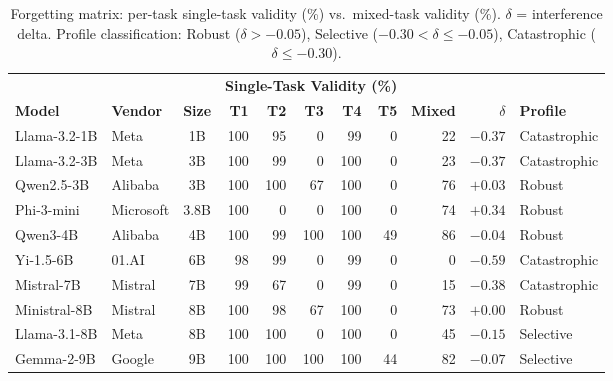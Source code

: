 \documentclass[11pt]{article}
\begin{document}
\begin{table}[t]
\centering
\caption{Forgetting matrix: per-task single-task validity (\%) vs.\ mixed-task validity (\%). $\delta$ = interference delta.  Profile classification: \textcolor{robust}{Robust} ($\delta > -0.05$), \textcolor{selective}{Selective} ($-0.30 < \delta \leq -0.05$), \textcolor{catastrophic}{Catastrophic} ($\delta \leq -0.30$).}
\label{tab:forgetting}
\small
\begin{adjustbox}{max width=\textwidth}
\begin{tabular}{llc rrrrr rr l}
\toprule
& & & \multicolumn{5}{c}{\textbf{Single-Task Validity (\%)}} & & & \\
\cmidrule(lr){4-8}
\textbf{Model} & \textbf{Vendor} & \textbf{Size} & \textbf{T1} & \textbf{T2} & \textbf{T3} & \textbf{T4} & \textbf{T5} & \textbf{Mixed} & $\delta$ & \textbf{Profile} \\
\midrule
Llama-3.2-1B    & Meta      & 1B   & 100 & 95 & 0  & 99 & 0  & 22 & $-0.37$ & \textcolor{catastrophic}{Catastrophic} \\
Llama-3.2-3B    & Meta      & 3B   & 100 & 99 & 0  & 100 & 0  & 23 & $-0.37$ & \textcolor{catastrophic}{Catastrophic} \\
Qwen2.5-3B      & Alibaba   & 3B   & 100 & 100 & 67 & 100 & 0  & 76 & \textcolor{robust}{$+0.03$} & \textcolor{robust}{Robust} \\
Phi-3-mini       & Microsoft & 3.8B & 100 & 0  & 0  & 100 & 0  & 74 & \textcolor{robust}{$+0.34$} & \textcolor{robust}{Robust} \\
Qwen3-4B         & Alibaba   & 4B   & 100 & 99 & 100 & 100 & 49 & 86 & \textcolor{robust}{$-0.04$} & \textcolor{robust}{Robust} \\
Yi-1.5-6B        & 01.AI     & 6B   & 98 & 99 & 0  & 99 & 0  & 0  & $-0.59$ & \textcolor{catastrophic}{Catastrophic} \\
Mistral-7B       & Mistral   & 7B   & 99 & 67 & 0  & 99 & 0  & 15 & $-0.38$ & \textcolor{catastrophic}{Catastrophic} \\
Ministral-8B     & Mistral   & 8B   & 100 & 98 & 67 & 100 & 0  & 73 & \textcolor{robust}{$+0.00$} & \textcolor{robust}{Robust} \\
Llama-3.1-8B     & Meta      & 8B   & 100 & 100 & 0  & 100 & 0  & 45 & \textcolor{selective}{$-0.15$} & \textcolor{selective}{Selective} \\
Gemma-2-9B       & Google    & 9B   & 100 & 100 & 100 & 100 & 44 & 82 & \textcolor{selective}{$-0.07$} & \textcolor{selective}{Selective} \\
\bottomrule
\end{tabular}
\end{adjustbox}
\end{table}
\end{document}
